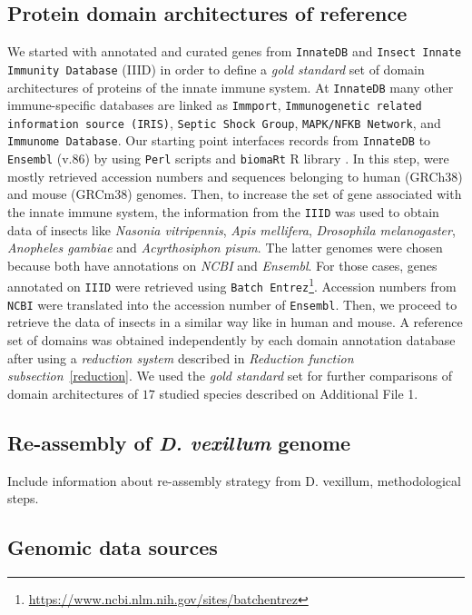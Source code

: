 \documentclass[11pt]{article}
\newcommand{\TODO}[1]{\begingroup\color{red}#1\endgroup}
\begin{document}
\subsection*{Protein domain architectures of reference}
We started with annotated and curated genes from \texttt{InnateDB} 
\cite{Breuer01012013} and \texttt{Insect Innate Immunity Database} (IIID) 
\cite{Brucker2012} in order to define a \textsl{gold standard} set of domain 
architectures of proteins of the innate immune system. At \texttt{InnateDB} many 
other immune-specific databases are linked as \texttt{Immport}, 
\texttt{Immunogenetic related information source (IRIS)}, \texttt{Septic Shock 
Group}, \texttt{MAPK/NFKB Network}, and \texttt{Immunome Database}. Our starting 
point interfaces records from \texttt{InnateDB} to \texttt{Ensembl} (v.86) 
by using \texttt{Perl} scripts and \texttt{biomaRt} R library 
\cite{Durinck:2009aa}. In this step, were mostly retrieved accession numbers 
and sequences belonging to human (GRCh38) and mouse (GRCm38) genomes. Then, to 
increase the set of gene associated with the innate immune system, the 
information from the \texttt{IIID} was used to obtain data of insects like 
\textsl{Nasonia vitripennis}, \textsl{Apis mellifera}, \textsl{Drosophila 
melanogaster}, \textsl{Anopheles gambiae} and \textsl{Acyrthosiphon pisum}. The 
latter genomes were chosen because both have annotations on \textsl{NCBI} and 
\textsl{Ensembl}. For those cases, genes annotated on \texttt{IIID} were 
retrieved using \texttt{Batch Entrez}\footnote{\url{
https://www.ncbi.nlm.nih.gov/sites/batchentrez}}. 
Accession numbers from \texttt{NCBI} were translated into the accession number 
of \texttt{Ensembl}. Then, we proceed to retrieve the data of insects in a 
similar way like in human and mouse. A reference set of domains was obtained 
independently by each domain annotation database after using a \textsl{reduction 
system} described in \textsl{Reduction function subsection}~\ref{reduction}. We 
used the \textsl{gold standard} set for further comparisons of domain 
architectures of $17$ studied species described on Additional File 1.

\subsection*{Re-assembly of \textit{D. vexillum} genome}
\TODO{Include information about re-assembly strategy from D. vexillum, 
methodological steps.}

\subsection*{Genomic data sources}
\end{document}
